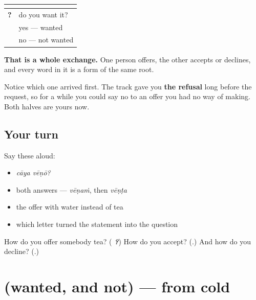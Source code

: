 \begin{grammarlens}[title={Grammar Lens: a three-way set you now own}]
\noindent
\begin{tabularx}{\linewidth}{@{}>{\raggedright\arraybackslash}X>{\raggedright\arraybackslash}X@{}}
\toprule
\textbf{} & \textbf{} \\
\midrule
\textbf{\ml{വേണോ}?} & do you want it? \\
\textbf{\ml{വേണം}} & yes — wanted \\
\textbf{\ml{വേണ്ട}} & no — not wanted \\
\bottomrule
\end{tabularx}

\textbf{That is a whole exchange.} One person offers, the other accepts or declines, and every word in it is a form of the same root.

Notice which one arrived first. The track gave you \textbf{the refusal} long before the request, so for a while you could say no to an offer you had no way of making. Both halves are yours now.
\end{grammarlens}

\subsection*{Your turn}
Say these aloud:

\begin{itemize}
\raggedright
  \item \emph{cāya vēṇō?}
  \item both answers — \emph{vēṇaṁ}, then \emph{vēṇṭa}
  \item the offer with water instead of tea
  \item which letter turned the statement into the question
\end{itemize}

\begin{tcolorbox}[breakable,colback=teal!4,colframe=teal!35!black,title={Before you move on}]
How do you offer somebody tea? (\emph{\textbf{ ?}}) How do you accept? (\emph{\textbf{}}.) And how do you decline? (\emph{\textbf{}}.)
\end{tcolorbox}
\section[(wanted, and not)]{(wanted, and not) — from cold}

\label{lesson:ML-R76-want-recall}



